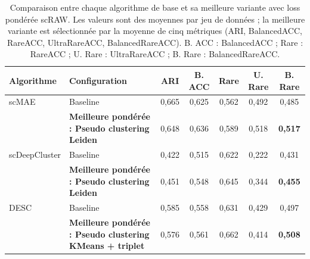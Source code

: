 \begin{table}[H]
\centering
\small
\renewcommand{\arraystretch}{1.08}
\begin{tabularx}{\textwidth}{l X c c c c c}
\toprule
\textbf{Algorithme} & \textbf{Configuration} & \textbf{ARI} & \textbf{B. ACC} & \textbf{Rare} & \textbf{U. Rare} & \textbf{B. Rare} \\
\midrule
scMAE & Baseline & 0,665 & 0,625 & 0,562 & 0,492 & 0,485 \\
 & \textbf{Meilleure pondérée : Pseudo clustering Leiden} & 0,648 & 0,636 & 0,589 & 0,518 & \textbf{0,517} \\
\addlinespace[0.2em]
scDeepCluster & Baseline & 0,422 & 0,515 & 0,622 & 0,222 & 0,431 \\
 & \textbf{Meilleure pondérée : Pseudo clustering Leiden} & 0,451 & 0,548 & 0,645 & 0,344 & \textbf{0,455} \\
\addlinespace[0.2em]
DESC & Baseline & 0,585 & 0,558 & 0,631 & 0,429 & 0,497 \\
 & \textbf{Meilleure pondérée : Pseudo clustering KMeans + triplet} & 0,576 & 0,561 & 0,662 & 0,414 & \textbf{0,508} \\
\bottomrule
\end{tabularx}
\caption[Synthèse du transfert de loss scRAW]{Comparaison entre chaque algorithme de base et sa meilleure variante avec loss pondérée scRAW. Les valeurs sont des moyennes par jeu de données ; la meilleure variante est sélectionnée par la moyenne de cinq métriques (ARI, BalancedACC, RareACC, UltraRareACC, BalancedRareACC). B. ACC : BalancedACC ; Rare : RareACC ; U. Rare : UltraRareACC ; B. Rare : BalancedRareACC.}
\label{tab:loss_transfer_baseline_vs_best}
\end{table}
